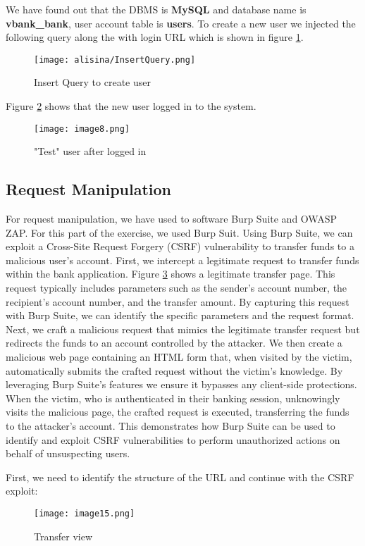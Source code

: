 We have found out that the DBMS is \textbf{MySQL} and database name is \textbf{vbank\_bank}, user account table is \textbf{users}.
To create a new user we injected the following query along the with login URL which is shown in figure \ref{fig:insertQeury}.
\begin{figure}[H]
    \centering
    \texttt{[image: alisina/InsertQuery.png]}
    \caption{Insert Query to create user}
    \label{fig:insertQeury}
\end{figure}
Figure \ref{fig:testUser} shows that the new user logged in to the system.
\begin{figure}[H]
    \centering
    \texttt{[image: image8.png]}
    \caption{"Test" user after logged in}
    \label{fig:testUser}
\end{figure}

\subsection{Request Manipulation }
For request manipulation, we have used to software Burp Suite and OWASP ZAP. For this part of the exercise, we used Burp Suit.
Using Burp Suite, we can exploit a Cross-Site Request Forgery (CSRF) vulnerability to transfer funds to a malicious user's account. 
First, we intercept a legitimate request to transfer funds within the bank application. Figure \ref{fig:legitimateTransfer} shows a legitimate transfer page.
This request typically includes parameters such as the sender's account number, the recipient's account number, and the transfer amount. 
By capturing this request with Burp Suite, we can identify the specific parameters and the request format. 
Next, we craft a malicious request that mimics the legitimate transfer request but redirects the funds to an account controlled by the attacker. 
We then create a malicious web page containing an HTML form that, when visited by the victim, automatically submits the crafted request without the victim’s knowledge. 
By leveraging Burp Suite's features we ensure it bypasses any client-side protections. 
When the victim, who is authenticated in their banking session, unknowingly visits the malicious page, the crafted request is executed, transferring the funds to the attacker's account. 
This demonstrates how Burp Suite can be used to identify and exploit CSRF vulnerabilities to perform unauthorized actions on behalf of unsuspecting users.

First, we need to identify the structure of the URL and continue with the CSRF exploit:
\begin{figure}[H]
    \centering
    \texttt{[image: image15.png]}
    \caption{Transfer view}
    \label{fig:legitimateTransfer}
\end{figure}


